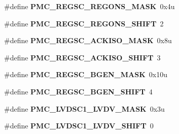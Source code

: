 \begin{DoxyCompactItemize}
\item 
\#define {\bfseries P\+M\+C\+\_\+\+R\+E\+G\+S\+C\+\_\+\+R\+E\+G\+O\+N\+S\+\_\+\+M\+A\+SK}~0x4u\hypertarget{group__PMC__Register__Masks_gab830f2c82eef6d0db7caab8ee5689ba6}{}\label{group__PMC__Register__Masks_gab830f2c82eef6d0db7caab8ee5689ba6}

\item 
\#define {\bfseries P\+M\+C\+\_\+\+R\+E\+G\+S\+C\+\_\+\+R\+E\+G\+O\+N\+S\+\_\+\+S\+H\+I\+FT}~2\hypertarget{group__PMC__Register__Masks_ga06b4e6d970f2610a635c92bb1270541d}{}\label{group__PMC__Register__Masks_ga06b4e6d970f2610a635c92bb1270541d}

\item 
\#define {\bfseries P\+M\+C\+\_\+\+R\+E\+G\+S\+C\+\_\+\+A\+C\+K\+I\+S\+O\+\_\+\+M\+A\+SK}~0x8u\hypertarget{group__PMC__Register__Masks_ga35ced6f0f133b2d5892bdcba3e0b2832}{}\label{group__PMC__Register__Masks_ga35ced6f0f133b2d5892bdcba3e0b2832}

\item 
\#define {\bfseries P\+M\+C\+\_\+\+R\+E\+G\+S\+C\+\_\+\+A\+C\+K\+I\+S\+O\+\_\+\+S\+H\+I\+FT}~3\hypertarget{group__PMC__Register__Masks_gad2b9b6ce6aa455e8607fd3c2d1647544}{}\label{group__PMC__Register__Masks_gad2b9b6ce6aa455e8607fd3c2d1647544}

\item 
\#define {\bfseries P\+M\+C\+\_\+\+R\+E\+G\+S\+C\+\_\+\+B\+G\+E\+N\+\_\+\+M\+A\+SK}~0x10u\hypertarget{group__PMC__Register__Masks_ga7e1520a56f4d2675018d5efaa9492f19}{}\label{group__PMC__Register__Masks_ga7e1520a56f4d2675018d5efaa9492f19}

\item 
\#define {\bfseries P\+M\+C\+\_\+\+R\+E\+G\+S\+C\+\_\+\+B\+G\+E\+N\+\_\+\+S\+H\+I\+FT}~4\hypertarget{group__PMC__Register__Masks_gab43d258e6864ee3a7a728de1d720f6fe}{}\label{group__PMC__Register__Masks_gab43d258e6864ee3a7a728de1d720f6fe}

\item 
\#define {\bfseries P\+M\+C\+\_\+\+L\+V\+D\+S\+C1\+\_\+\+L\+V\+D\+V\+\_\+\+M\+A\+SK}~0x3u\hypertarget{group__PMC__Register__Masks_ga777eada2a526d88569a30323e9d3e1d3}{}\label{group__PMC__Register__Masks_ga777eada2a526d88569a30323e9d3e1d3}

\item 
\#define {\bfseries P\+M\+C\+\_\+\+L\+V\+D\+S\+C1\+\_\+\+L\+V\+D\+V\+\_\+\+S\+H\+I\+FT}~0\hypertarget{group__PMC__Register__Masks_gaaf45daa6de387f93bc57f1218ab17a16}{}\label{group__PMC__Register__Masks_gaaf45daa6de387f93bc57f1218ab17a16}


\end{DoxyCompactItemize}
